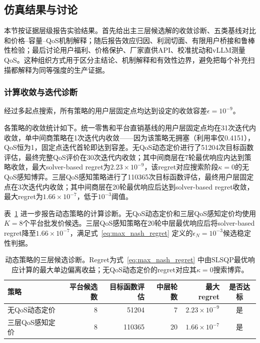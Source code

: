 \documentclass[UTF8,11pt]{ctexart}
\begin{document}
\subsection{仿真结果与讨论}
\label{sec:simulation_results}

本节按证据层级报告实验结果。首先给出主三层候选解的收敛诊断、五类基线对比和价格--容量--QoS机制解释；随后报告效应归因、利润切面、有限用户桥接和鲁棒性检验；最后讨论用户福利、价格保护、厂家直供API、校准扰动和vLLM测量QoS。这种组织方式用于区分主结论、机制解释和有效性边界，避免把每个补充扫描都解释为同等强度的生产证据。

\subsubsection{计算收敛与迭代诊断}
\label{sec:calculation_convergence}

经过多起点搜索，所有策略的用户层固定点均达到设定的收敛容差$\epsilon=10^{-9}$。

各策略的收敛统计如下。统一零售和平台直销基线的用户层固定点均在31次迭代内收敛，单中间商策略在1次迭代内收敛——因为该策略无拥塞（利用率仅0.4151），QoS恒为1，固定点迭代首轮即达到容差。无QoS动态定价进行了51204次目标函数评估，最终完整QoS评价在30次迭代内收敛；其中间商层在7轮最优响应内达到策略收敛，最大solver-based regret为$2.23\times10^{-9}$，该regret对应搜索阶段$\kappa=0$的无QoS感知博弈。三层QoS感知策略进行了110365次目标函数评估，最终用户层固定点在3次迭代内收敛；其中间商层在20轮最优响应后达到solver-based regret收敛，最大regret为$1.66\times10^{-7}$，低于$10^{-3}$阈值。

表~\ref{tab:equilibrium_diagnostics} 进一步报告动态策略的计算诊断。无QoS动态定价和三层QoS感知定价均使用$K=8$个平台批发价候选。三层QoS感知策略在20轮中层最优响应后将solver-based regret降至$1.66\times10^{-7}$，满足式~\eqref{eq:max_nash_regret} 定义的$\epsilon_N=10^{-3}$候选稳定性判据。

\begin{table}[H]
\centering
\caption{动态策略的三层候选诊断。Regret为式~\eqref{eq:max_nash_regret} 中由SLSQP最优响应计算的最大单边偏离收益；无QoS动态定价的regret对应其$\kappa=0$搜索博弈。}
\label{tab:equilibrium_diagnostics}
\begin{tabular}{lrrrrc}
\toprule
策略 & 平台候选数 & 目标函数评估 & 中层轮数 & 最大regret & 是否达标 \\
\midrule
无QoS动态定价 & 8 & 51204 & 7  & $2.23\times10^{-9}$ & 是 \\
三层QoS感知定价 & 8 & 110365 & 20 & $1.66\times10^{-7}$  & 是 \\
\bottomrule
\end{tabular}
\end{table}
\end{document}
